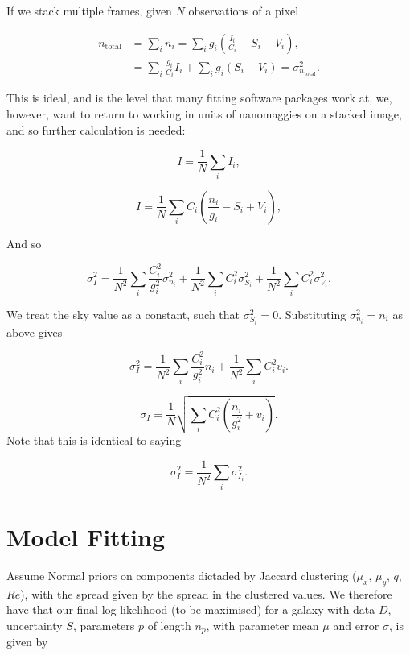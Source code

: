 \documentclass[../main.tex]{subfiles}
\begin{document}
If we stack multiple frames, given $N$ observations of a pixel

\begin{equation}
  \begin{aligned}
n_\mathrm{total} &= \sum_i{n_i} = \sum_i g_i\left(\frac{I_i}{C_i} + S_i - V_i\right),\\
                 &= \sum_{i}\frac{g_i}{C_i}I_i + \sum_i{g_i \left(S_i - V_i\right)} = \sigma_{n_\mathrm{total}}^2.
  \end{aligned}
\end{equation}

This is ideal, and is the level that many fitting software packages work at, we, however, want to return to working in units of nanomaggies on a stacked image, and so further calculation is needed:

\begin{equation}
I = \frac{1}{N}\sum_i I_i,
\end{equation}

\begin{equation}
I = \frac{1}{N}\sum_i C_i\left(\frac{n_i}{g_i} - S_i + V_i\right),
\end{equation}

And so

\begin{equation}
  \sigma_I^2 = \frac{1}{N^2}\sum_i\frac{C_i^2}{g_i^2}\sigma_{n_i}^2 + \frac{1}{N^2}\sum_i C_i^2 \sigma_{S_i}^2 + \frac{1}{N^2}\sum_i C_i^2 \sigma_{V_i}^2.
\end{equation}

We treat the sky value as a constant, such that $\sigma_{S_i}^2 = 0$. Substituting $\sigma_{n_i}^2 = n_i$ as above gives

\begin{equation}
  \sigma_I^2 = \frac{1}{N^2}\sum_i\frac{C_i^2}{g_i^2}n_i + \frac{1}{N^2}\sum_i C_i^2 v_i.
\end{equation}

\begin{equation}
  \sigma_I = \frac{1}{N}\sqrt{\sum_i C_i^2\left(\frac{n_i}{g_i^2} + v_i\right)}.
\end{equation}
Note that this is identical to saying

\begin{equation}
\sigma_I^2 = \frac{1}{N^2}\sum_i\sigma_{I_i}^2.
\end{equation}


\section{Model Fitting}
\label{sec:appendix_model_fitting}
Assume Normal priors on components dictaded by Jaccard clustering ($\mu_x$, $\mu_y$, $q$, $Re$), with the spread given by the spread in the clustered values. We therefore have that our final log-likelihood (to be maximised) for a galaxy with data $D$, uncertainty $S$, parameters $p$ of length $n_p$, with parameter mean $\mu$ and  error $\sigma$, is given by
\end{document}
